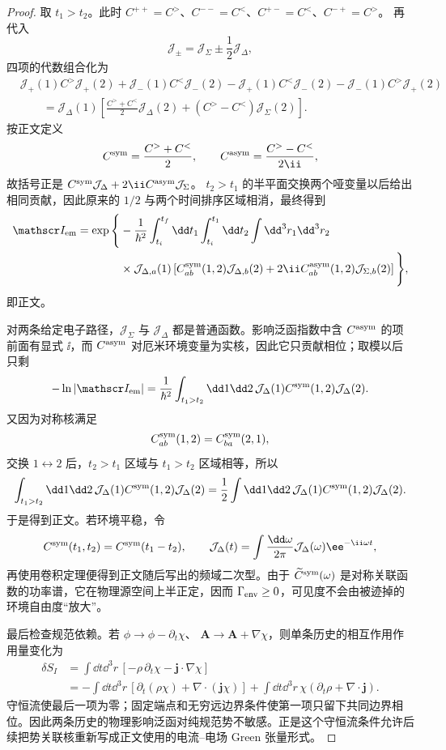 \begin{proof}
取 $t_1>t_2$。此时
$C^{++}=C^>$、$C^{--}=C^<$、$C^{+-}=C^<$、$C^{-+}=C^>$。
再代入
\[
\mathcal J_\pm
=\mathcal J_\Sigma\pm\frac12\mathcal J_\Delta,
\]
四项的代数组合化为
\begin{align*}
&\mathcal J_+(1)C^>\mathcal J_+(2)
+\mathcal J_-(1)C^<\mathcal J_-(2)
-\mathcal J_+(1)C^<\mathcal J_-(2)
-\mathcal J_-(1)C^>\mathcal J_+(2)\\
&\qquad=
\mathcal J_\Delta(1)
\left[
\frac{C^>+C^<}{2}\mathcal J_\Delta(2)
+(C^>-C^<)\mathcal J_\Sigma(2)
\right].
\end{align*}
按正文定义
\[
C^{\rm sym}=\frac{C^>+C^<}{2},
\qquad
C^{\rm asym}=\frac{C^>-C^<}{2\ii},
\]
故括号正是
$C^{\rm sym}\mathcal J_\Delta+2\ii C^{\rm asym}\mathcal J_\Sigma$。
$t_2>t_1$ 的半平面交换两个哑变量以后给出相同贡献，因此原来的 $1/2$ 与两个时间排序区域相消，最终得到
\[
\begin{aligned}
\mathscr I_{\rm em}
=\exp\Bigg\{&-\frac1{\hbar^2}
\int_{t_i}^{t_f}\dd t_1
\int_{t_i}^{t_1}\dd t_2
\int\dd^3r_1\dd^3r_2\\
&\times\mathcal J_{\Delta,a}(1)
\left[
C_{ab}^{\rm sym}(1,2)\mathcal J_{\Delta,b}(2)
+2\ii C_{ab}^{\rm asym}(1,2)\mathcal J_{\Sigma,b}(2)
\right]\Bigg\},
\end{aligned}
\]
即正文。

对两条给定电子路径，$\mathcal J_\Sigma$ 与 $\mathcal J_\Delta$ 都是普通函数。影响泛函指数中含 $C^{\rm asym}$ 的项前面有显式 $\ii$，而 $C^{\rm asym}$ 对厄米环境变量为实核，因此它只贡献相位；取模以后只剩
\[
-\ln|\mathscr I_{\rm em}|
=\frac1{\hbar^2}
\int_{t_1>t_2}\dd1\dd2\,
\mathcal J_\Delta(1)C^{\rm sym}(1,2)\mathcal J_\Delta(2).
\]
又因为对称核满足
\[
C_{ab}^{\rm sym}(1,2)=C_{ba}^{\rm sym}(2,1),
\]
交换 $1\leftrightarrow2$ 后，$t_2>t_1$ 区域与 $t_1>t_2$ 区域相等，所以
\[
\int_{t_1>t_2}\dd1\dd2\,
\mathcal J_\Delta(1)C^{\rm sym}(1,2)\mathcal J_\Delta(2)
=\frac12\int\dd1\dd2\,
\mathcal J_\Delta(1)C^{\rm sym}(1,2)\mathcal J_\Delta(2).
\]
于是得到正文。若环境平稳，令
\[
C^{\rm sym}(t_1,t_2)=C^{\rm sym}(t_1-t_2),
\qquad
\mathcal J_\Delta(t)=\int\frac{\dd\omega}{2\pi}
\mathcal J_\Delta(\omega)\ee^{-\ii\omega t},
\]
再使用卷积定理便得到正文随后写出的频域二次型。由于 $\widetilde C^{\rm sym}(\omega)$ 是对称关联函数的功率谱，它在物理源空间上半正定，因而 $\Gamma_{\rm env}\ge0$，可见度不会由被迹掉的环境自由度“放大”。

最后检查规范依赖。若
$\phi\to\phi-\partial_t\chi$、
$\mathbf A\to\mathbf A+\nabla\chi$，则单条历史的相互作用作用量变化为
\begin{align*}
\delta S_I
&=\int\dd t\dd^3r\,
[-\rho\,\partial_t\chi-\mathbf j\cdot\nabla\chi]\\
&=-\int\dd t\dd^3r\,
[\partial_t(\rho\chi)+\nabla\cdot(\mathbf j\chi)]
+\int\dd t\dd^3r\,
\chi(\partial_t\rho+\nabla\cdot\mathbf j).
\end{align*}
守恒流使最后一项为零；固定端点和无穷远边界条件使第一项只留下共同边界相位。因此两条历史的物理影响泛函对纯规范势不敏感。正是这个守恒流条件允许后续把势关联核重新写成正文使用的电流--电场 Green 张量形式。
\end{proof}


